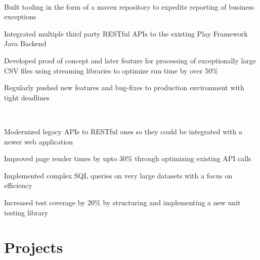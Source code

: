 \documentclass[]{hieudo-build}
\begin{document}
\begin{minipage}[t]{1.0\textwidth}
 \\
\begin{tightemize}
\item Built tooling in the form of a maven repository to expedite reporting of business exceptions
\item Integrated multiple third party RESTful APIs to the existing Play Framework Java Backend
\item Developed proof of concept and later feature for processing of exceptionally large CSV files using streaming libraries to optimize run time by over 50\% 
\item Regularly pushed new features and bug-fixes to production environment with tight deadlines
\end{tightemize}
\sectionsep

 \\
\begin{tightemize}
\item Modernized legacy APIs to RESTful ones so they could be integrated with a newer web application
\item Improved page render times by upto 30\% through optimizing existing API calls
\item Implemented complex SQL queries on very large datasets with a focus on efficiency 
\item  Increased test coverage by 20\% by structuring and implementing a new unit testing library
\end{tightemize}

\begin{center}
\end{center}





\section{Projects}


\end{minipage}
\end{document}
